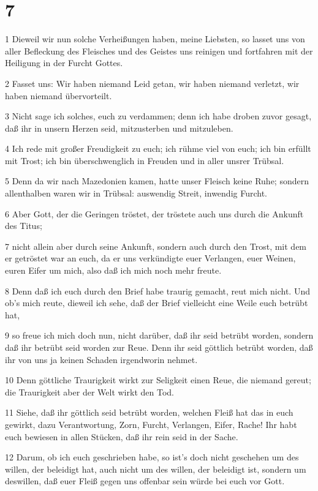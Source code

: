 \chapter{7}

\par 1 Dieweil wir nun solche Verheißungen haben, meine Liebsten, so lasset uns von aller Befleckung des Fleisches und des Geistes uns reinigen und fortfahren mit der Heiligung in der Furcht Gottes.
\par 2 Fasset uns: Wir haben niemand Leid getan, wir haben niemand verletzt, wir haben niemand übervorteilt.
\par 3 Nicht sage ich solches, euch zu verdammen; denn ich habe droben zuvor gesagt, daß ihr in unsern Herzen seid, mitzusterben und mitzuleben.
\par 4 Ich rede mit großer Freudigkeit zu euch; ich rühme viel von euch; ich bin erfüllt mit Trost; ich bin überschwenglich in Freuden und in aller unsrer Trübsal.
\par 5 Denn da wir nach Mazedonien kamen, hatte unser Fleisch keine Ruhe; sondern allenthalben waren wir in Trübsal: auswendig Streit, inwendig Furcht.
\par 6 Aber Gott, der die Geringen tröstet, der tröstete auch uns durch die Ankunft des Titus;
\par 7 nicht allein aber durch seine Ankunft, sondern auch durch den Trost, mit dem er getröstet war an euch, da er uns verkündigte euer Verlangen, euer Weinen, euren Eifer um mich, also daß ich mich noch mehr freute.
\par 8 Denn daß ich euch durch den Brief habe traurig gemacht, reut mich nicht. Und ob's mich reute, dieweil ich sehe, daß der Brief vielleicht eine Weile euch betrübt hat,
\par 9 so freue ich mich doch nun, nicht darüber, daß ihr seid betrübt worden, sondern daß ihr betrübt seid worden zur Reue. Denn ihr seid göttlich betrübt worden, daß ihr von uns ja keinen Schaden irgendworin nehmet.
\par 10 Denn göttliche Traurigkeit wirkt zur Seligkeit einen Reue, die niemand gereut; die Traurigkeit aber der Welt wirkt den Tod.
\par 11 Siehe, daß ihr göttlich seid betrübt worden, welchen Fleiß hat das in euch gewirkt, dazu Verantwortung, Zorn, Furcht, Verlangen, Eifer, Rache! Ihr habt euch bewiesen in allen Stücken, daß ihr rein seid in der Sache.
\par 12 Darum, ob ich euch geschrieben habe, so ist's doch nicht geschehen um des willen, der beleidigt hat, auch nicht um des willen, der beleidigt ist, sondern um deswillen, daß euer Fleiß gegen uns offenbar sein würde bei euch vor Gott.
